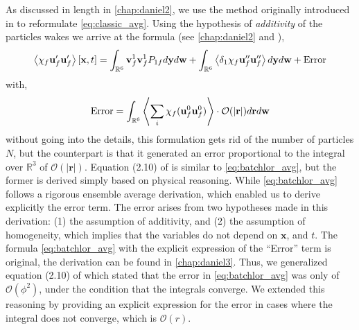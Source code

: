 As discussed in length in \ref{chap:daniel2}, we use the method originally introduced in \citet{batchelor1972sedimentation} to reformulate \ref{eq:classic_avg}. 
Using the hypothesis of \textit{additivity} of the particles wakes we arrive at the formula (see \ref{chap:daniel2} and \citet{batchelor1972sedimentation}), 
\begin{align}
    \avg{\chi_f \textbf{u}_f' \textbf{u}_f'}[\textbf{x},t] =
    \int_{\mathbb{R}^6}
    \textbf{v}_f^1
    \textbf{v}_f^1
    P_{1f}
    d\textbf{y}
    d\textbf{w}
    + 
    \int_{\mathbb{R}^6}
    \avg{\delta_1 \chi_f\textbf{u}_f'' \textbf{u}_f''}
    d\textbf{y}
    d\textbf{w}
    +
    \text{Error}
    \label{eq:batchlor_avg}
\end{align}
with, 
\begin{equation}
    \text{Error}
    = 
    \int_{\mathbb{R}^6}
    \avg{\sum_i
    \chi_f (\textbf{u}_f^0\textbf{u}_f^0)
    }\cdot\mathcal{O}(|\textbf{r}|)
    d\textbf{r}
    d\textbf{w}
    \label{eq:error}
\end{equation}
without going into the details, this formulation gets rid of the number of particles $N$, but the counterpart is that it generated an error proportional to the integral over $\mathbb{R}^3$ of $\mathcal{O}(|\textbf{r}|)$.
Equation (2.10) of \citet{batchelor1972sedimentation} is similar to \ref{eq:batchlor_avg}, but the former is derived simply based on physical reasoning.
While \ref{eq:batchlor_avg} follows a rigorous ensemble average derivation, which enabled us to derive explicitly the error term. 
The error arises from two hypotheses made in this derivation: (1) the assumption of additivity, and (2) the assumption of homogeneity, which implies that the variables do not depend on $\textbf{x}$, and $t$. 
The formula \ref{eq:batchlor_avg} with the explicit expression of the ``Error'' term is original, the derivation can be found in \ref{chap:daniel3}. 
Thus, we generalized equation (2.10) of \citet{batchelor1972sedimentation} which stated that the error in \ref{eq:batchlor_avg} was only of $\mathcal{O}(\phi^2)$, under the condition that the integrals converge. 
We extended this reasoning by providing an explicit expression for the error in cases where the integral does not converge, which is  $\mathcal{O}(r)$. 


